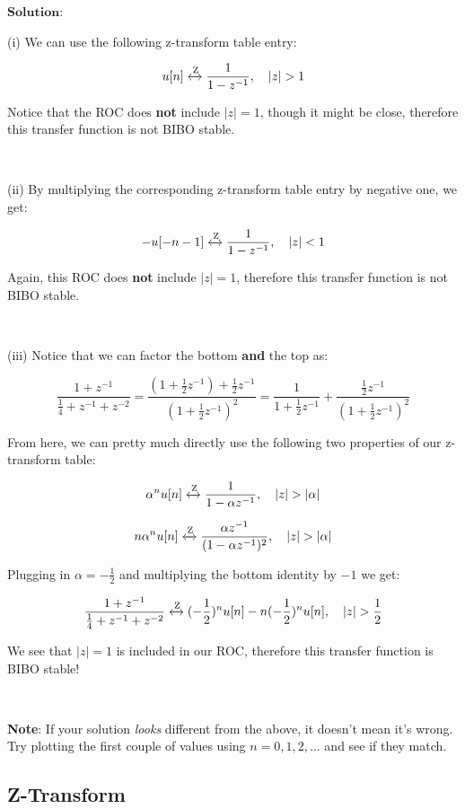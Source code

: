 \documentclass{article}
\begin{document}
\noindent $\textbf{Solution}$:

\noindent (i) We can use the following z-transform table entry:

$$u[n] \xleftrightarrow{\text{Z}} \frac{1}{1-z^{-1}},  \ \ \ |z| > 1$$

\noindent Notice that the ROC does \textbf{not} include $|z| = 1$, though it might be close, therefore this transfer function is not BIBO stable.

\

\noindent (ii) By multiplying the corresponding z-transform table entry by negative one, we get:

$$-u[-n-1] \xleftrightarrow{\text{Z}} \frac{1}{1-z^{-1}},  \ \ \ |z| < 1$$

\noindent Again, this ROC does \textbf{not} include $|z| = 1$, therefore this transfer function is not BIBO stable.

\

\noindent (iii) Notice that we can factor the bottom \textbf{and} the top as:

$$\frac{1+z^{-1}}{\frac{1}{4} + z^{-1} + z^{-2}} = \frac{(1+\frac{1}{2}z^{-1}) + \frac{1}{2}z^{-1}}{(1+\frac{1}{2}z^{-1})^2} = \frac{1}{1+\frac{1}{2}z^{-1}} + \frac{\frac{1}{2}z^{-1}}{(1+\frac{1}{2}z^{-1})^2}$$

\noindent From here, we can pretty much directly use the following two properties of our z-transform table:

$$\alpha^n u[n] \xleftrightarrow{\text{Z}} \frac{1}{1-\alpha z^{-1}}, \ \ \ |z| > |\alpha|$$

$$n \alpha^n u[n] \xleftrightarrow{\text{Z}} \frac{\alpha z^{-1}}{(1-\alpha z^{-1})^2}, \ \ \ |z| > |\alpha|$$

\noindent Plugging in $\alpha = -\frac{1}{2}$ and multiplying the bottom identity by $-1$ we get:

$$\frac{1+z^{-1}}{\frac{1}{4} + z^{-1} + z^{-2}} \xleftrightarrow{\text{Z}} (-\frac{1}{2})^nu[n] - n(-\frac{1}{2})^nu[n], \ \ \ |z| > \frac{1}{2}$$

\noindent We see that $|z| = 1$ is included in our ROC, therefore this transfer function is BIBO stable! 

\

\noindent \textbf{Note}: If your solution \textit{looks} different from the above, it doesn't mean it's wrong. Try plotting the first couple of values using $n=0,1,2,...$ and see if they match.

\newpage

\subsection{Z-Transform}
\end{document}
